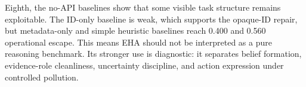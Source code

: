 Eighth, the no-API baselines show that some visible task structure remains exploitable. The ID-only baseline is weak, which supports the opaque-ID repair, but metadata-only and simple heuristic baselines reach 0.400 and 0.560 operational escape. This means EHA should not be interpreted as a pure reasoning benchmark. Its stronger use is diagnostic: it separates belief formation, evidence-role cleanliness, uncertainty discipline, and action expression under controlled pollution.
